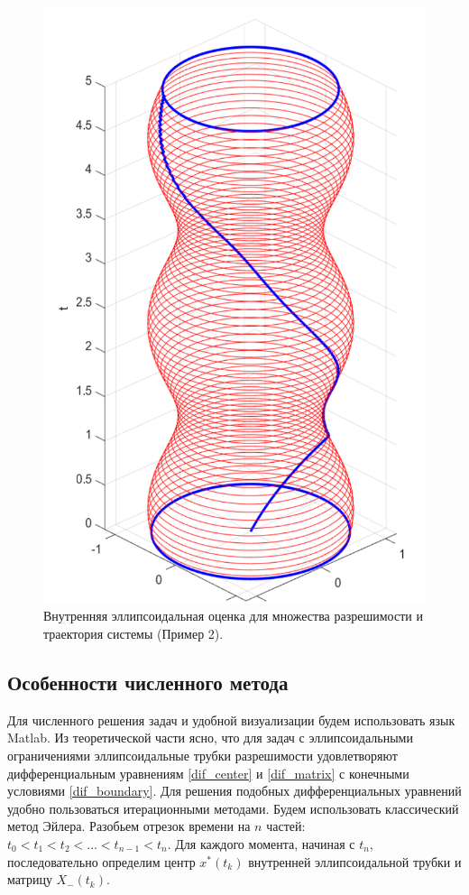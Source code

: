 \begin{figure}[ht]
	\centering
	\includegraphics[width = 0.5\linewidth]{"./resources/evolution_with_touch_3_cropped.pdf"}
	\caption{Внутренняя эллипсоидальная оценка для множества разрешимости и траектория системы (Пример 2).}
    \label{fig:inner_tube_2}
\end{figure}

\subsection{Особенности численного метода}

Для численного решения задач и удобной визуализации будем использовать язык
 Matlab. Из теоретической части ясно, что для задач с эллипсоидальными ограничениями
 эллипсоидальные трубки разрешимости удовлетворяют дифференциальным уравнениям \eqref{dif_center}
 и  \eqref{dif_matrix} с конечными условиями \eqref{dif_boundary}.
Для решения подобных дифференциальных уравнений удобно пользоваться итерационными 
 методами. Будем использовать классический метод Эйлера.
Разобьем отрезок времени на \( n \) частей: \( t_0 < t_1 < t_2 < \dots < t_{n-1} < t_n \). 
 Для каждого момента, начиная с \( t_n \), последовательно определим центр \( x^*(t_k) \) внутренней
 эллипсоидальной трубки и матрицу \( X_-(t_k) \). 

